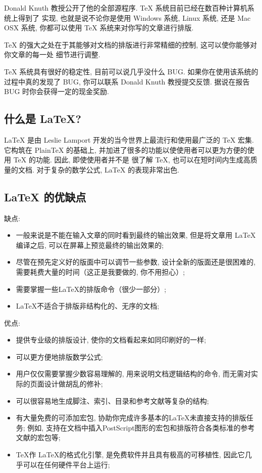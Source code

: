 \documentclass{cugthesis}
\begin{document}
    Donald Knuth 教授公开了他的全部源程序. \TeX{} 系统目前已经在数百种计算机系统上得到了
    实现, 也就是说不论你是使用 Windows 系统, Linux 系统, 还是 Mac OSX 系统, 你都可以使用
    \TeX{} 系统来对你写的文章进行排版. 

    \TeX{} 的强大之处在于其能够对文档的排版进行非常精细的控制, 这可以使你能够对你文章的每一处
    细节进行调整.

    \TeX{} 系统具有很好的稳定性, 目前可以说几乎没什么 BUG. 如果你在使用该系统的过程中真的发现了
    BUG, 你可以联系 Donald Knuth 教授提交反馈. 据说在报告 BUG 时你会获得一定的现金奖励.
\subsection{什么是 \LaTeX{}?}
\label{sec:sub_what_is_latex_}
    \LaTeX{} 是由 Leslie Lamport 开发的当今世界上最流行和使用最广泛的 \TeX{} 宏集. 它构筑在 PlainTeX
    的基础上, 并加进了很多的功能以使使用者可以更为方便的使用 \TeX{} 的功能. 因此, 即使使用者并不是
    很了解 \TeX{}, 也可以在短时间内生成高质量的文档. 对于复杂的数学公式, \LaTeX{} 的表现非常出色.

\subsection{\LaTeX{} 的优缺点}
\label{sec:sub_latex_advantages_disabvantages_}
缺点: 
\begin{itemize}
    \item 一般来说是不能在输入文章的同时看到最终的输出效果, 但是将文章用 \LaTeX{}编译之后, 可以在屏幕上预览最终的输出效果的; 
    \item 尽管在预先定义好的版面中可以调节一些参数, 设计全新的版面还是很困难的, 需要耗费大量的时间（这正是我要做的, 你不用担心）; 
    \item 需要掌握一些\LaTeX{}的排版命令（很少一部分）; 
    \item \LaTeX{}不适合于排版非结构化的、无序的文档; 
\end{itemize}

优点:
\begin{itemize}
    \item 提供专业级的排版设计, 使你的文档看起来如同印刷好的一样; 
    \item 可以更方便地排版数学公式; 
    \item 用户仅仅需要掌握少数容易理解的, 用来说明文档逻辑结构的命令, 而无需对实际的页面设计做胡乱的修补; 
    \item 可以很容易地生成脚注、索引、目录和参考文献等复杂的结构; 
    \item 有大量免费的可添加宏包, 协助你完成许多基本的LaTeX未直接支持的排版任务; 例如, 支持在文档中插入PostScript图形的宏包和排版符合各类标准的参考文献的宏包等; 
    \item \TeX{}作 \LaTeX{}的格式化引擎, 是免费软件并且具有极高的可移植性, 因此它几乎可以在任何硬件平台上运行; 
\end{itemize}
\end{document}
